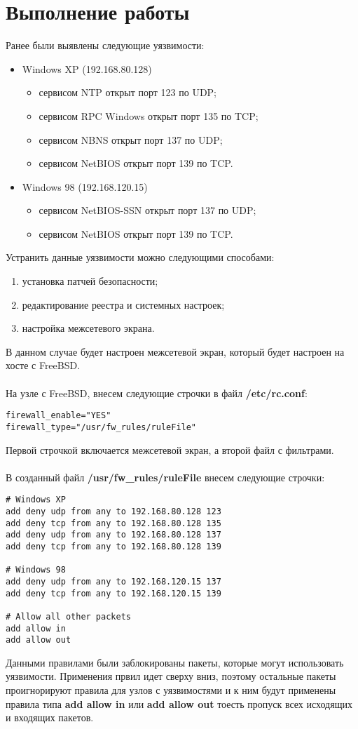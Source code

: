 \documentclass[14pt,a4paper,report]{report}
\begin{document}
\section{Выполнение работы}
Ранее были выявлены следующие уязвимости:
\begin{itemize}
\item Windows XP (192.168.80.128)
\begin{itemize}
\item сервисом NTP открыт порт 123 по UDP;
\item сервисом RPC Windows открыт порт 135 по TCP;
\item сервисом NBNS открыт порт 137 по UDP;
\item сервисом NetBIOS открыт порт 139 по TCP.
\end{itemize}
\item Windows 98 (192.168.120.15)
\begin{itemize}
\item сервисом NetBIOS-SSN открыт порт 137 по UDP;
\item сервисом NetBIOS открыт порт 139 по TCP.
\end{itemize}
\end{itemize}

Устранить данные уязвимости можно следующими способами:
\begin{enumerate}
\item установка патчей безопасности;
\item редактирование реестра и системных настроек;
\item настройка межсетевого экрана.
\end{enumerate}
В данном случае будет настроен межсетевой экран, который будет настроен на хосте с FreeBSD.\\\\
На узле с FreeBSD, внесем следующие строчки в файл \textbf{/etc/rc.conf}:
\begin{lstlisting}[language={}]
firewall_enable="YES"
firewall_type="/usr/fw_rules/ruleFile"
\end{lstlisting}
Первой строчкой включается межсетевой экран, а второй файл с фильтрами.\\\\
В созданный файл \textbf{/usr/fw\_rules/ruleFile} внесем следующие строчки:
\begin{lstlisting}[language={}]
# Windows XP
add deny udp from any to 192.168.80.128 123
add deny tcp from any to 192.168.80.128 135
add deny udp from any to 192.168.80.128 137
add deny tcp from any to 192.168.80.128 139

# Windows 98
add deny udp from any to 192.168.120.15 137
add deny tcp from any to 192.168.120.15 139

# Allow all other packets
add allow in
add allow out
\end{lstlisting}
Данными правилами были заблокированы пакеты, которые могут использовать уязвимости. Применения првил идет сверху вниз, поэтому остальные пакеты проигнорируют правила для узлов с уязвимостями и к ним будут применены правила типа \textbf{add allow in} или \textbf{add allow out} тоесть пропуск всех исходящих и входящих пакетов.
\end{document}
